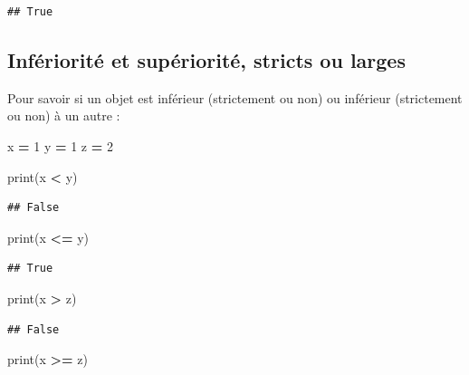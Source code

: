 \documentclass[
  12pt,
]{book}
\newenvironment{Shaded}{\begin{snugshade}}{\end{snugshade}}
\newcommand{\BuiltInTok}[1]{#1}
\newcommand{\DecValTok}[1]{\textcolor[rgb]{0.00,0.00,0.81}{#1}}
\newcommand{\NormalTok}[1]{#1}
\newcommand{\OperatorTok}[1]{\textcolor[rgb]{0.81,0.36,0.00}{\textbf{#1}}}
\numberwithin{equation}{section}
\numberwithin{countremarque}{section}
\begin{document}
\begin{lstlisting}
## True
\end{lstlisting}

\subsection{Infériorité et supériorité, stricts ou larges}\label{infuxe9riorituxe9-et-supuxe9riorituxe9-stricts-ou-larges}

Pour savoir si un objet est inférieur (strictement ou non) ou inférieur (strictement ou non) à un autre :

\begin{Shaded}
\begin{Highlighting}[]
\NormalTok{x }\OperatorTok{=} \DecValTok{1}
\NormalTok{y }\OperatorTok{=} \DecValTok{1}
\NormalTok{z }\OperatorTok{=} \DecValTok{2}

\BuiltInTok{print}\NormalTok{(x }\OperatorTok{\textless{}}\NormalTok{ y)}
\end{Highlighting}
\end{Shaded}

\begin{lstlisting}
## False
\end{lstlisting}

\begin{Shaded}
\begin{Highlighting}[]
\BuiltInTok{print}\NormalTok{(x }\OperatorTok{\textless{}=}\NormalTok{ y)}
\end{Highlighting}
\end{Shaded}

\begin{lstlisting}
## True
\end{lstlisting}

\begin{Shaded}
\begin{Highlighting}[]
\BuiltInTok{print}\NormalTok{(x }\OperatorTok{\textgreater{}}\NormalTok{ z)}
\end{Highlighting}
\end{Shaded}

\begin{lstlisting}
## False
\end{lstlisting}

\begin{Shaded}
\begin{Highlighting}[]
\BuiltInTok{print}\NormalTok{(x }\OperatorTok{\textgreater{}=}\NormalTok{ z)}
\end{Highlighting}
\end{Shaded}
\end{document}
